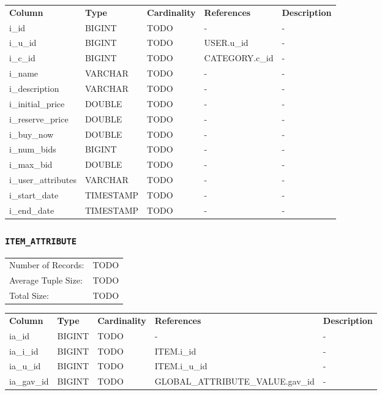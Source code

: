 \documentclass[a4paper,10pt]{article}
\begin{document}
\noindent \begin{tabular*}{\textwidth}{@{\extracolsep{\fill}} lllll}
\textbf{Column} & \textbf{Type} & \textbf{Cardinality} & \textbf{References} & \textbf{Description} \\
i\_id              & BIGINT     & TODO & -               & - \\
i\_u\_id           & BIGINT     & TODO & USER.u\_id      & - \\
i\_c\_id           & BIGINT     & TODO & CATEGORY.c\_id  & - \\
i\_name            & VARCHAR    & TODO & -               & - \\
i\_description     & VARCHAR    & TODO & -               & - \\
i\_initial\_price  & DOUBLE     & TODO & -               & - \\
i\_reserve\_price  & DOUBLE     & TODO & -               & - \\
i\_buy\_now        & DOUBLE     & TODO & -               & - \\
i\_num\_bids       & BIGINT     & TODO & -               & - \\
i\_max\_bid        & DOUBLE     & TODO & -               & - \\
i\_user\_attributes & VARCHAR    & TODO & -               & - \\
i\_start\_date     & TIMESTAMP  & TODO & -               & - \\
i\_end\_date       & TIMESTAMP  & TODO & -               & - \\
\end{tabular*}

\subsubsection{\texttt{ITEM\_ATTRIBUTE}}

\begin{tabular}{ll}
Number of Records:      & TODO \\
Average Tuple Size:     & TODO \\
Total Size:             & TODO \\
\end{tabular}

\vspace*{0.1in}

\noindent \begin{tabular*}{\textwidth}{@{\extracolsep{\fill}} lllll}
\textbf{Column} & \textbf{Type} & \textbf{Cardinality} & \textbf{References} & \textbf{Description} \\
ia\_id             & BIGINT     & TODO & -               & - \\
ia\_i\_id          & BIGINT     & TODO & ITEM.i\_id      & - \\
ia\_u\_id          & BIGINT     & TODO & ITEM.i\_u\_id   & - \\
ia\_gav\_id        & BIGINT     & TODO & GLOBAL\_ATTRIBUTE\_VALUE.gav\_id & - \\
\end{tabular*}
\end{document}
